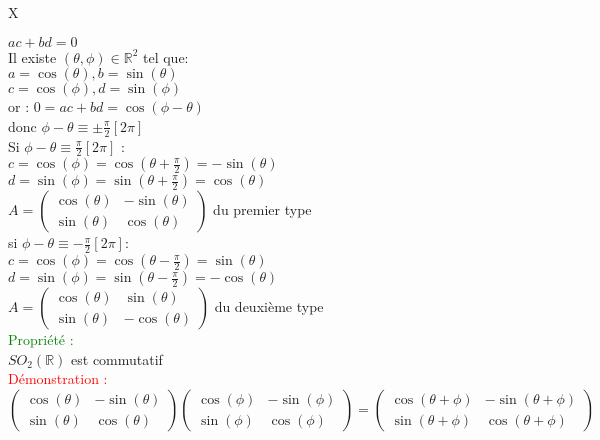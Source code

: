 X\documentclass{article}
\begin{document}
$ac+bd=0$ \\
Il existe $(\theta,\phi) \in \mathbb R^2$ tel que: \\
$a=\cos(\theta),b=\sin(\theta)$ \\
$c=\cos(\phi),d=\sin(\phi)$ \\
or : $0= ac+bd=  \cos(\phi-\theta)$ \\
donc $\phi- \theta \equiv \pm \frac \pi 2 [2\pi]$ \\
Si $\phi - \theta \equiv \frac \pi 2 [2 \pi ]$ : \\
$c=\cos(\phi)=\cos(\theta + \frac \pi 2)=-\sin(\theta)$ \\
$d=\sin(\phi)=\sin(\theta + \frac \pi 2)=\cos(\theta)$ \\
$A=\begin{pmatrix}
\cos(\theta) &- \sin(\theta) \\
\sin(\theta) & \cos(\theta)
\end{pmatrix}$ du premier type  \\
si $\phi - \theta \equiv - \frac \pi 2 [2\pi] :$ \\
$c=\cos(\phi)=\cos(\theta-\frac \pi 2)= \sin(\theta)$ \\
$d=\sin(\phi)=\sin(\theta-\frac \pi 2)=-\cos(\theta)$ \\
$A=\begin{pmatrix}
\cos(\theta) & \sin(\theta) \\
\sin(\theta) & -\cos(\theta)
\end{pmatrix}$ du deuxième type \\
\textcolor{green}{Propriété :} \\
$SO_2(\mathbb R)$ est commutatif\\
\textcolor{red}{Démonstration :} \\
$\begin{pmatrix}
\cos(\theta) & -\sin(\theta) \\
\sin(\theta) & \cos(\theta)
\end{pmatrix}
\begin{pmatrix}
\cos(\phi) & - \sin(\phi) \\
\sin(\phi) & \cos(\phi)
\end{pmatrix}
=
\begin{pmatrix}
\cos(\theta + \phi) & - \sin(\theta + \phi) \\
\sin(\theta + \phi) & \cos(\theta + \phi)
\end{pmatrix}$
\end{document}
